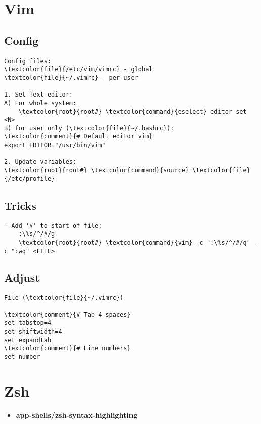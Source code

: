 \documentclass[10pt, a4paper, onecolumn, openany]{book}         %
\begin{document}
\section{Vim}
\subsection{Config}
\begin{Verbatim}[commandchars=\\\{\}]
Config files:
\textcolor{file}{/etc/vim/vimrc} - global
\textcolor{file}{~/.vimrc} - per user

1. Set Text editor:
A) For whole system:
    \textcolor{root}{root#} \textcolor{command}{eselect} editor set <N>
B) for user only (\textcolor{file}{~/.bashrc}):
\textcolor{comment}{# Default editor vim}
export EDITOR="/usr/bin/vim"

2. Update variables:
\textcolor{root}{root#} \textcolor{command}{source} \textcolor{file}{/etc/profile}
\end{Verbatim}
\subsection{Tricks}
\begin{Verbatim}[commandchars=\\\{\}]
- Add '#' to start of file:
    :\%s/^/#/g
    \textcolor{root}{root#} \textcolor{command}{vim} -c ":\%s/^/#/g" -c ":wq" <FILE>
\end{Verbatim}

\subsection{Adjust}
\begin{Verbatim}[commandchars=\\\{\}]
File (\textcolor{file}{~/.vimrc})

\textcolor{comment}{# Tab 4 spaces}
set tabstop=4
set shiftwidth=4
set expandtab
\textcolor{comment}{# Line numbers}
set number
\end{Verbatim}




\section{Zsh}
\begin{itemize}
    \item \textbf{app-shells/zsh-syntax-highlighting}
\end{itemize}
\end{document}

